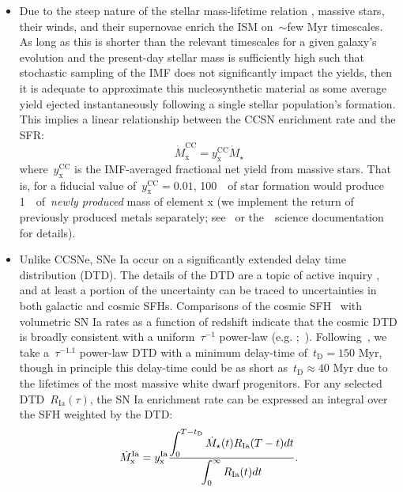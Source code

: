 \documentclass[ms.tex]{subfiles}
\begin{document}
\begin{itemize}
	\item Due to the steep nature of the stellar mass-lifetime relation
	\citep[e.g.][]{Larson1974, Maeder1989, Hurley2000}, massive stars, their
	winds, and their supernovae enrich the ISM on~$\sim$few Myr timescales.
	As long as this is shorter than the relevant timescales for a given
	galaxy's evolution and the present-day stellar mass is sufficiently high
	such that stochastic sampling of the IMF does not significantly impact the
	yields, then it is adequate to approximate this nucleosynthetic material as
	some average yield ejected instantaneously following a single stellar
	population's formation.
	This implies a linear relationship between the CCSN enrichment rate and
	the SFR:
	\begin{equation}
	\label{eq:mdot_cc}
	\dot{M}_\text{x}^\text{CC} = y_\text{x}^\text{CC}\dot{M}_\star
	\end{equation}
	where~$y_\text{x}^\text{CC}$ is the IMF-averaged fractional net yield from
	massive stars.
	That is, for a fiducial value of~$y_\text{x}^\text{CC} = 0.01$, 100~\msun~of
	star formation would produce 1~\msun~of~\textit{newly produced} mass of
	element x (we implement the return of previously produced metals separately;
	see~\citealt{Johnson2020} or the~\vice~science documentation for details).


	\item Unlike CCSNe, SNe Ia occur on a significantly extended delay time
	distribution (DTD).
	The details of the DTD are a topic of active inquiry
	\citep[e.g.][]{Greggio2005, Strolger2020, Freundlich2021}, and at least a
	portion of the uncertainty can be traced to uncertainties in both galactic
	and cosmic SFHs.
	Comparisons of the cosmic SFH~\citep[e.g.][]{Hopkins2006, Madau2014,
	Davies2016, Madau2017, Driver2018} with
	volumetric SN Ia rates as a function of redshift indicate that the cosmic
	DTD is broadly consistent with a uniform~$\tau^{-1}$ power-law (e.g.
	\citealp*{Maoz2012a, Maoz2012b, Graur2013};~\citealp{Graur2014}).
	Following~\citet{Weinberg2017}, we take a~$\tau^{-1.1}$ power-law DTD with a
	minimum delay-time of~$t_\text{D} = 150$ Myr, though in principle this
	delay-time could be as short as~$t_\text{D} \approx 40$ Myr due to the
	lifetimes of the most massive white dwarf progenitors.
	For any selected DTD~$R_\text{Ia}(\tau)$, the SN Ia enrichment rate can be
	expressed an integral over the SFH weighted by the DTD:
	\begin{equation}
	\dot{M}_\text{x}^\text{Ia} = y_\text{x}^\text{Ia} \frac{\displaystyle{
		\int_0^{T - t_\text{D}} \dot{M}_\star(t) R_\text{Ia}(T - t) dt
	}}{\displaystyle{
		\int_0^\infty R_\text{Ia}(t) dt
	}}.
	\end{equation}


\end{itemize}
\end{document}
